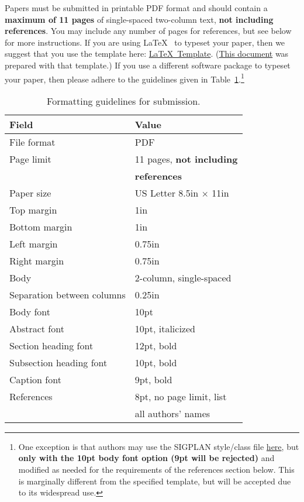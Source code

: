 \documentclass[pageno]{jpaper}
\begin{document}
Papers must be submitted in printable PDF format and 
should contain a {\bf maximum of 11 pages} of 
single-spaced two-column text, {\bf not including references}. 
You may include any number of pages for references, 
but see below for more instructions.  If you are using
\LaTeX~\cite{lamport94} to typeset your paper, then we suggest that you use
the template here:
\href{http://asplos15.bilkent.edu.tr/files/asplos15-latex-template.tar.gz}{\LaTeX~Template}.
(\href{http://asplos15.bilkent.edu.tr/files/asplos15-template.pdf}{This
document} was prepared with that template.)  If you use a different
software package to typeset your paper, then please adhere to the
guidelines given in Table~\ref{table:formatting}.\footnote{One exception is
that authors may use the SIGPLAN style/class file
\href{http://classic.sigplan.org/sigplanconf.cls}{here}, but {\bf only with
the 10pt body font option (9pt will be rejected)} and modified as needed
for the requirements of the references section below.  This is marginally
different from the specified template, but will be accepted due to its
widespread use.}

\begin{table}[h!]
  \centering
  \begin{tabular}{|l|l|}
    \hline
    \textbf{Field} & \textbf{Value}\\
    \hline
    \hline
    File format & PDF \\
    \hline
    Page limit & 11 pages, {\bf not including}\\
               & {\bf references}\\
    \hline
    Paper size & US Letter 8.5in $\times$ 11in\\
    \hline
    Top margin & 1in\\
    \hline
    Bottom margin & 1in\\
    \hline
    Left margin & 0.75in\\
    \hline
    Right margin & 0.75in\\
    \hline
    Body & 2-column, single-spaced\\
    \hline
    Separation between columns & 0.25in\\
    \hline
    Body font & 10pt\\
    \hline
    Abstract font & 10pt, italicized\\
    \hline
    Section heading font & 12pt, bold\\
    \hline
    Subsection heading font & 10pt, bold\\
    \hline
    Caption font & 9pt, bold\\
    \hline
    References & 8pt, no page limit, list \\
               & all authors' names\\
    \hline
  \end{tabular}
  \caption{Formatting guidelines for submission. }
  \label{table:formatting}
\end{table}
\end{document}
